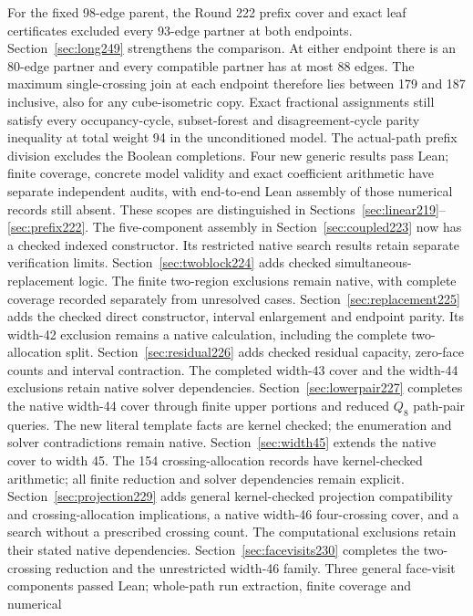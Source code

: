 \documentclass[11pt,a4paper]{article}
\theoremstyle{definition}
\theoremstyle{remark}
\begin{document}
For the fixed 98-edge parent, the Round 222 prefix cover and exact
leaf certificates excluded every 93-edge partner at both endpoints.
Section~\ref{sec:long249} strengthens the comparison. At either
endpoint there is an 80-edge partner and every compatible partner
has at most 88 edges. The maximum single-crossing join at each
endpoint therefore lies between 179 and 187 inclusive, also for any
cube-isometric copy. Exact fractional assignments still satisfy every occupancy-cycle,
subset-forest and disagreement-cycle parity inequality at total weight
94 in the unconditioned model. The actual-path prefix division excludes
the Boolean completions. Four new generic results pass Lean; finite
coverage, concrete model validity and exact coefficient arithmetic have
separate independent audits, with end-to-end Lean assembly of those
numerical records still absent. These scopes are distinguished in
Sections~\ref{sec:linear219}--\ref{sec:prefix222}.
The five-component assembly in Section~\ref{sec:coupled223} now
has a checked indexed constructor. Its restricted native search results
retain separate verification limits.
Section~\ref{sec:twoblock224} adds checked simultaneous-replacement
logic. The finite two-region exclusions remain native, with complete
coverage recorded separately from unresolved cases.
Section~\ref{sec:replacement225} adds the checked direct constructor,
interval enlargement and endpoint parity. Its width-42 exclusion remains
a native calculation, including the complete two-allocation split.
Section~\ref{sec:residual226} adds checked residual capacity, zero-face
counts and interval contraction. The completed width-43 cover and the
width-44 exclusions retain native solver dependencies.
Section~\ref{sec:lowerpair227} completes the native width-44 cover through
finite upper portions and reduced $Q_8$ path-pair queries. The new literal
template facts are kernel checked; the enumeration and solver contradictions
remain native.
Section~\ref{sec:width45} extends the native cover to width 45.
The 154 crossing-allocation records have kernel-checked arithmetic;
all finite reduction and solver dependencies remain explicit.
Section~\ref{sec:projection229} adds general kernel-checked projection
compatibility and crossing-allocation implications, a native width-46
four-crossing cover, and a search without a prescribed crossing count.
The computational exclusions retain their stated native dependencies.
Section~\ref{sec:facevisits230} completes the two-crossing reduction and
the unrestricted width-46 family. Three general face-visit components
passed Lean; whole-path run extraction, finite coverage and numerical
\end{document}
